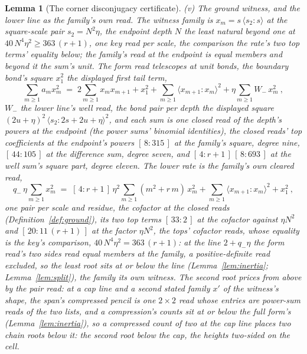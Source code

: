 \documentclass[11pt]{article}
\newtheorem{lemma}{Lemma}
\theoremstyle{definition}
\begin{document}
\begin{lemma}[The corner disconjugacy certificate]
\emph{(v) The ground witness, and the lower line as the family's
own read.} The witness family is $x_m=s\,\langle s_2\!:\!s\rangle$
at the square-scale pair $s_2=N^{2}\eta$, the \emph{endpoint
depth} $N$ the least natural beyond one at
$40\,N^{4}\eta^{2}\ge363\,(r+1)$, one key read per scale, the
comparison the rate's two top terms' equality below; the family's
read at the endpoint is equal members and beyond it the sum's
unit. The form read telescopes at unit bonds, the
boundary bond's square $x_1^{2}$ the displayed first tail term,
\[
\sum_{m\ge1} a_m x_m^{2}
\;=\;2\sum_{m\ge1} x_m x_{m+1}
+x_1^{2}+\sum_{m\ge1}\langle x_{m+1}\!:\!x_m\rangle^{2}
+\eta\sum_{m\ge1}W_{-}\,x_m^{2}\ ,
\]
$W_{-}$ the lower line's well read, the bond pair per depth the
displayed square
$(2u+\eta)^{2}\,\langle s_2\!:\!2s+2u+\eta\rangle^{2}$, and each sum is one closed
read of the depth's powers at the endpoint (the power sums'
binomial identities), the closed reads' top coefficients at the
endpoint's powers $[\,8:315\,]$ at the family's square, degree
nine, $[\,44:105\,]$ at the difference sum, degree seven, and
$[\,4:r+1\,]\,[\,8:693\,]$ at the well sum's square part, degree
eleven. The \emph{lower rate} is the family's own cleared read,
\[
q_{-}\,\eta\sum_{m\ge1}x_m^{2}
\;=\;[\,4:r+1\,]\,\eta^{2}\sum_{m\ge1}(m^{2}+r\,m)\,x_m^{2}
+\sum_{m\ge1}\langle x_{m+1}\!:\!x_m\rangle^{2}+x_1^{2}\ ,
\]
one pair per scale and residue, the cofactor at the closed reads
(Definition~\ref{def:ground}), its two top terms $[\,33:2\,]$ at
the cofactor against $\eta N^{2}$ and $[\,20:11\,(r+1)\,]$ at the
factor $\eta N^{2}$, the tops' cofactor reads, whose equality is
the key's comparison, $40\,N^{4}\eta^{2}=363\,(r+1)$: at the line
$2+q_{-}\eta$ the form read's two sides read equal members at the
family, a positive-definite read excluded, so the least root sits
at or below the line (Lemma~\ref{lem:inertia};
Lemma~\ref{lem:split}), the family its own witness. The
second root prices from above by the pair read: at a cap line and
a second stated family $x'$ of the witness's shape, the span's
compressed pencil is one $2\times2$ read whose entries are
power-sum reads of the two lists, and a compression's counts sit at or below the
full form's (Lemma~\ref{lem:inertia}), so a compressed count of
two at the cap line places two chain roots below it: the second
root below the cap, the heights two-sided on the cell.


\end{lemma}
\end{document}
